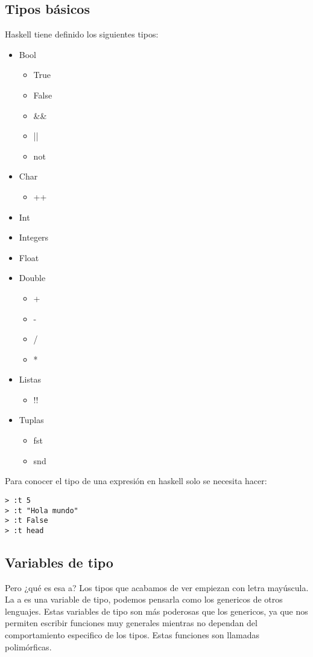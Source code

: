 \documentclass[11pt]{article}
\begin{document}
\subsection{Tipos básicos}
\label{sec:orgc0f8ae5}
Haskell tiene definido los siguientes tipos:
\begin{itemize}
\item Bool
\begin{itemize}
\item True
\item False
\item \&\&
\item ||
\item not
\end{itemize}
\item Char
\begin{itemize}
\item ++
\end{itemize}
\item Int
\item Integers
\item Float
\item Double
\begin{itemize}
\item +
\item -
\item /
\item *
\end{itemize}
\item Listas
\begin{itemize}
\item !!
\end{itemize}
\item Tuplas
\begin{itemize}
\item fst
\item snd
\end{itemize}
\end{itemize}

Para conocer el tipo de una expresión  en haskell solo se necesita hacer:
\begin{verbatim}
> :t 5
> :t "Hola mundo"
> :t False
> :t head
\end{verbatim}
\subsection{Variables de tipo}
\label{sec:orga033e84}
Pero ¿qué es esa a? Los tipos que acabamos de ver empiezan con letra mayúscula.
La a es una variable de tipo, podemos pensarla como los genericos de otros lenguajes.
Estas variables de tipo son más poderosas que los genericos, ya que nos 
permiten escribir funciones muy generales mientras no dependan del comportamiento
especifico de los tipos. Estas funciones son llamadas polimórficas.
\end{document}
